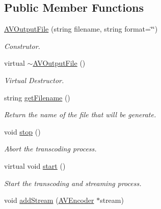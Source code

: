\subsection*{Public Member Functions}
\begin{DoxyCompactItemize}
\item 
\hyperlink{classbr_1_1ufscar_1_1lince_1_1streaming_1_1AVOutputFile_ace075f9dcbf56a275f646dcf5ca5075d}{AVOutputFile} (string filename, string format=\char`\"{}\char`\"{})
\begin{DoxyCompactList}\small\item\em Construtor. \item\end{DoxyCompactList}\item 
virtual \hyperlink{classbr_1_1ufscar_1_1lince_1_1streaming_1_1AVOutputFile_a867bc52c953208f0ed240450a6a219e9}{$\sim$AVOutputFile} ()
\begin{DoxyCompactList}\small\item\em Virtual Destructor. \item\end{DoxyCompactList}\item 
string \hyperlink{classbr_1_1ufscar_1_1lince_1_1streaming_1_1AVOutputFile_ada28bb7fce4192d132a33becd5a4ab9d}{getFilename} ()
\begin{DoxyCompactList}\small\item\em Return the name of the file that will be generate. \item\end{DoxyCompactList}\item 
void \hyperlink{classbr_1_1ufscar_1_1lince_1_1streaming_1_1AVOutputFile_a31a93f8972d0733a7b5dfe9cc376f66f}{stop} ()
\begin{DoxyCompactList}\small\item\em Abort the transcoding process. \item\end{DoxyCompactList}\item 
virtual void \hyperlink{classbr_1_1ufscar_1_1lince_1_1streaming_1_1AVOutputFile_a9f0853e01444d14e449dfbf820d60af1}{start} ()
\begin{DoxyCompactList}\small\item\em Start the transcoding and streaming process. \item\end{DoxyCompactList}\item 
void \hyperlink{classbr_1_1ufscar_1_1lince_1_1streaming_1_1AVOutputFile_a0357f82095145d9842bb02ecdd186152}{addStream} (\hyperlink{classbr_1_1ufscar_1_1lince_1_1streaming_1_1AVEncoder}{AVEncoder} $\ast$stream)

\end{DoxyCompactItemize}
